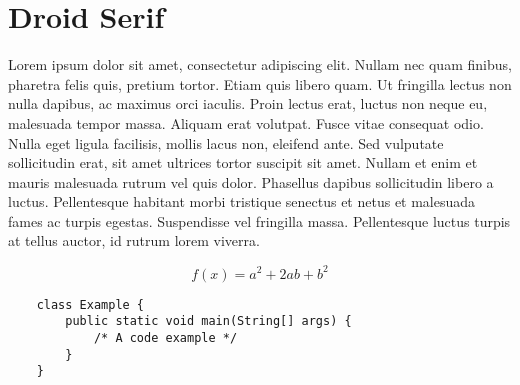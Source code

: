 \documentclass{article}
\begin{document}
\section*{Droid Serif}
\noindent Lorem ipsum dolor sit amet, consectetur adipiscing elit. Nullam nec
quam finibus, pharetra felis quis, pretium tortor. Etiam quis libero quam. Ut
fringilla lectus non nulla dapibus, ac maximus orci iaculis. Proin lectus erat,
luctus non neque eu, malesuada tempor massa. Aliquam erat volutpat. Fusce vitae
consequat odio. Nulla eget ligula facilisis, mollis lacus non, eleifend ante.
Sed vulputate sollicitudin erat, sit amet ultrices tortor suscipit sit amet.
Nullam et enim et mauris malesuada rutrum vel quis dolor. Phasellus dapibus
sollicitudin libero a luctus. Pellentesque habitant morbi tristique senectus et
netus et malesuada fames ac turpis egestas. Suspendisse vel fringilla massa.
Pellentesque luctus turpis at tellus auctor, id rutrum lorem viverra.

\bigskip

\begin{equation}
    f(x) = a^2 + 2ab + b^2 
\end{equation}

\bigskip

\begin{verbatim}
    class Example {
        public static void main(String[] args) {
            /* A code example */
        }
    }
\end{verbatim}
\end{document}
